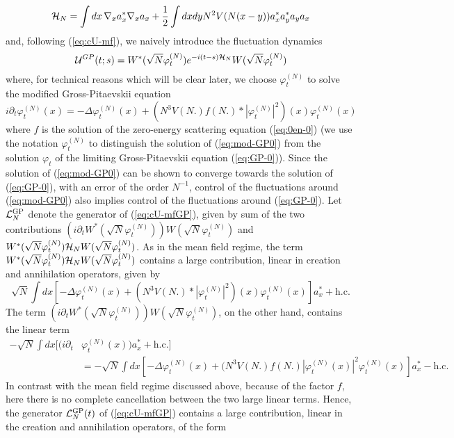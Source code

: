 \documentclass[11pt,a4paper]{article}
\newcommand{\cU}{{\cal U}}
\newcommand{\cH}{{\cal H}}
\newcommand{\cL}{{\cal L}}
\begin{document}
\begin{equation}\label{eq:cHN} \cH_N = \int dx \, \nabla_x a_x^* \nabla_x a_x + \frac{1}{2} \int dx dy N^2 V(N (x-y)) a_x^* a_y^* a_y a_x \end{equation}
and, following (\ref{eq:cU-mf}), we naively introduce the fluctuation dynamics
\begin{equation}\label{eq:cU-mfGP} 
\cU^{GP} (t;s) = W^* (\sqrt{N} \varphi^{(N)}_t) e^{-i (t-s) \cH_N} W(\sqrt{N} \varphi^{(N)}_t) \end{equation}
where, for technical reasons which will be clear later, we choose $\varphi^{(N)}_t$ to solve the modified Gross-Pitaevskii equation 
\begin{equation}\label{eq:mod-GP0} i\partial_t \varphi^{(N)}_t (x) = -\Delta \varphi^{(N)}_t (x) + (N^3 V(N.) f(N.) * |\varphi^{(N)}_t|^2) (x) \varphi^{(N)}_t (x) \end{equation}
where $f$ is the solution of the zero-energy scattering equation (\ref{eq:0en-0}) (we use the notation $\varphi_t^{(N)}$ to distinguish the solution of (\ref{eq:mod-GP0}) from the solution $\varphi_t$ of the limiting Gross-Pitaevskii equation (\ref{eq:GP-0})). Since the solution of (\ref{eq:mod-GP0}) can be shown to converge towards the solution of (\ref{eq:GP-0}), with an error of the order $N^{-1}$, control of the fluctuations around (\ref{eq:mod-GP0}) also implies control of the fluctuations around (\ref{eq:GP-0}). Let $\cL_N^{\text{GP}}$ denote the generator of (\ref{eq:cU-mfGP}), given by sum of the two contributions $(i\partial_t W^* (\sqrt{N} \varphi^{(N)}_t)) W (\sqrt{N} \varphi^{(N)}_t)$ and $W^* (\sqrt{N} \varphi^{(N)}_t) \cH_N W (\sqrt{N} \varphi^{(N)}_t)$. As in the mean field regime, the term $W^*(\sqrt{N} \varphi^{(N)}_t) \cH_N W(\sqrt{N} \varphi^{(N)}_t)$ contains a large contribution, linear in creation and annihilation operators, given by
\[ \sqrt{N} \int dx \left[ -\Delta \varphi^{(N)}_t (x) + (N^3 V (N.) * |\varphi^{(N)}_t|^2) (x) \varphi^{(N)}_t (x) \right] a_x^* + \text{h.c.} \] 
The term $(i\partial_t W^* (\sqrt{N} \varphi^{(N)}_t)) W (\sqrt{N} \varphi^{(N)}_t)$, on the other hand, contains the linear term
\[ \begin{split} 
- \sqrt{N} \int dx \big[ (i\partial_t &\varphi^{(N)}_t (x)) a_x^* + \text{h.c.}\big]  \\
&=- \sqrt{N} \int dx \left[ -\Delta \varphi^{(N)}_t (x) + (N^3 V(N.) f(N.) |\varphi^{(N)}_t (x)|^2 \varphi^{(N)}_t (x) \right] a_x^* - \text{h.c.}
\end{split}\]
In contrast with the mean field regime discussed above, because of the factor $f$, here there is no complete cancellation between the two large linear terms. Hence, the generator $\cL^{\text{GP}}_N (t)$ of (\ref{eq:cU-mfGP}) contains a large contribution, linear in the creation and annihilation operators, of the form
\end{document}
